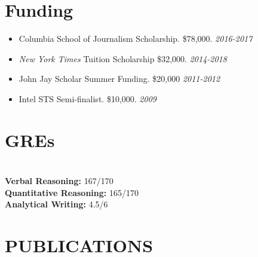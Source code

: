 \documentclass[margin]{res}
\newcommand{\fullhrulefill}{%
	\vspace{.7\baselineskip}
	\hspace*{-\sectionwidth}\hrulefill%
}
\begin{document}
\begin{resume}
\section{Funding}
\begin{itemize}
	\item[] Columbia School of Journalism  Scholarship. \$78,000. \hfill \textit{2016-2017}
	\item[] \textit{New York Times} Tuition Scholarship \$32,000. \hfill \textit{2014-2018}
	\item[] John Jay Scholar Summer Funding. \$20,000 \hfill \textit{2011-2012}
	\item[] Intel STS Semi-finalist. \$10,000. \hfill \textit{2009}
\end{itemize}

\section{GREs}
\fullhrulefill
\section{}
\textbf{Verbal Reasoning:} \hfill 167/170\\
\textbf{Quantitative Reasoning:} \hfill 165/170\\
\textbf{Analytical Writing:} \hfill 4.5/6

\section{PUBLICATIONS}
\fullhrulefill

\end{resume}
\end{document}
